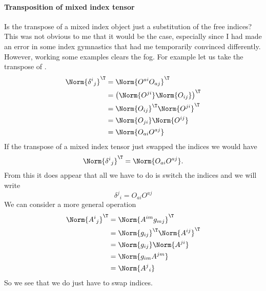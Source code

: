 \paragraph{Transposition of mixed index tensor}
%
Is the transpose of a mixed index object just a substitution of the free indices?  This was not obvious to me that it would be the case, especially since I had made an error in some index gymnastics that had me temporarily convinced differently.  However, working some examples clears the fog.  For example let us take the transpose of .
%
\begin{equation}\label{eqn:relativisticElectrodynamicsL11b:1440}
\begin{aligned}
\Norm{ {\delta^i}_j }^\T
&=
\Norm{ O^{a i} O_{a j} }^\T \\
&=
\left( \Norm{ O^{j i} } \Norm{ O_{i j} } \right)^\T \\
&=
\Norm{ O_{i j} }^\T
\Norm{ O^{j i} }^\T  \\
&=
\Norm{ O_{j i} }
\Norm{ O^{i j} } \\
&=
\Norm{ O_{a i} O^{a j} } \\
\end{aligned}
\end{equation}
%
If the transpose of a mixed index tensor just swapped the indices we would have
%
\begin{equation}\label{eqn:relativisticElectrodynamicsL11:1060}
\Norm{ {\delta^i}_j }^\T = \Norm{ O_{a i} O^{a j} }.
\end{equation}
From this it does appear that all we have to do is switch the indices and we will write
\begin{equation}\label{eqn:relativisticElectrodynamicsL11:1060b}
{\delta^j}_i = O_{a i} O^{a j}
\end{equation}
%
We can consider a more general operation
%
\begin{equation}\label{eqn:relativisticElectrodynamicsL11b:1460}
\begin{aligned}
\Norm{{A^i}_j}^\T
&=
\Norm{ A^{i m} g_{m j} }^\T \\
&=
\Norm{ g_{i j} }^\T
\Norm{ A^{i j} }^\T
 \\
&=
\Norm{ g_{i j} }
\Norm{ A^{j i} }
 \\
&=
\Norm{ g_{i m} A^{j m} }
 \\
&=
\Norm{ {A^{j}}_i }
\end{aligned}
\end{equation}
%
So we see that we do just have to swap indices.

